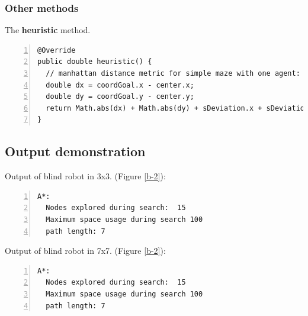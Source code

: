 \documentclass{article}
\begin{document}
\subsubsection{Other methods}



The \textbf{heuristic} method.
\begin{lstlisting}[numbers=left]
@Override
public double heuristic() {
  // manhattan distance metric for simple maze with one agent:
  double dx = coordGoal.x - center.x;
  double dy = coordGoal.y - center.y;
  return Math.abs(dx) + Math.abs(dy) + sDeviation.x + sDeviation.y;
}
\end{lstlisting}










\subsection{Output demonstration}

Output of blind robot in 3x3. (Figure \ref{b-2}):
\begin{lstlisting}[numbers=left]
A*:  
  Nodes explored during search:  15
  Maximum space usage during search 100
  path length: 7
\end{lstlisting}

Output of blind robot in 7x7. (Figure \ref{b-2}):
\begin{lstlisting}[numbers=left]
A*:  
  Nodes explored during search:  15
  Maximum space usage during search 100
  path length: 7
\end{lstlisting}
\end{document}
